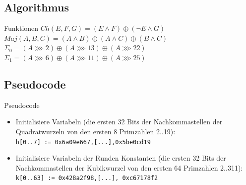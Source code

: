 \documentclass[xcolor=x11names,compress]{beamer}
\renewcommand{\(}{\begin{columns}}
\renewcommand{\)}{\end{columns}}
\newcommand{\<}[1]{\begin{column}{#1}}
\renewcommand{\>}{\end{column}}
\begin{document}
\subsection{Algorithmus}
\begin{frame}{Funktionen}
$ Ch(E,F,G) = (E\wedge F) \oplus (\neg E\wedge G)$
$ Maj(A,B,C) = (A\wedge B) \oplus (A\wedge C) \oplus (B\wedge C)$\\
$ \Sigma_0 = (A\ggg 2) \oplus (A\ggg 13) \oplus (A\ggg 22) $\\
$ \Sigma_1 = (A\ggg 6) \oplus (A\ggg 11) \oplus (A\ggg 25) $\\
\end{frame}
\subsection{Pseudocode}
\begin{frame}{Pseudocode}
\begin{itemize}
\item Initialisiere Variabeln
(die ersten 32 Bits der Nachkommastellen der Quadratwurzeln von den ersten 8 Primzahlen 2..19):\\
\texttt{h[0..7] := 0x6a09e667,[...],0x5be0cd19}
\pause
\item Initialisiere Variabeln der Runden Konstanten
(die ersten 32 Bits der Nachkommastellen der Kubikwurzel von den ersten 64 Primzahlen 2..311):\\
\texttt{k[0..63] := 0x428a2f98,[...], 0xc67178f2}
\end{itemize}



\end{frame}
\end{document}
